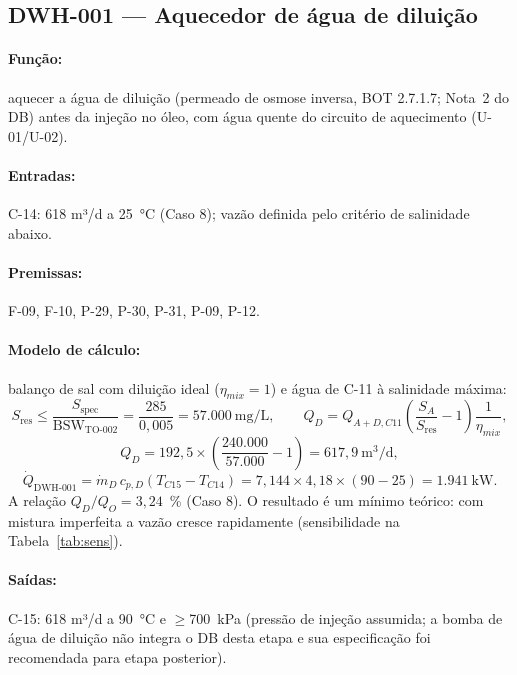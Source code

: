 \documentclass[11pt,a4paper]{article}
\numberwithin{equation}{section}
\numberwithin{table}{section}
\numberwithin{figure}{section}
\begin{document}
\subsection{DWH-001 --- Aquecedor de água de diluição}
\paragraph{Função:} aquecer a água de diluição (permeado de osmose inversa, BOT 2.7.1.7; Nota~2 do DB) antes da injeção no óleo, com água quente do circuito de aquecimento (U-01/U-02).
\paragraph{Entradas:} C-14: 618 m³/d a 25~\si{\celsius} (Caso 8); vazão definida pelo critério de salinidade abaixo.
\paragraph{Premissas:} F-09, F-10, P-29, P-30, P-31, P-09, P-12.
\paragraph{Modelo de cálculo:} balanço de sal com diluição ideal ($\eta_{mix}=1$) e água de C-11 à salinidade máxima:
\begin{equation}\label{eq:dil}
S_{\mathrm{res}}\le\frac{S_{\mathrm{spec}}}{\mathrm{BSW}_{\mbox{TO-002}}}=\frac{285}{0{,}005}=57.000\ \mathrm{mg/L},\qquad Q_{D}=Q_{A+D,C11}\left(\frac{S_A}{S_{\mathrm{res}}}-1\right)\frac{1}{\eta_{mix}},
\end{equation}
\begin{equation}
Q_D=192{,}5\times\left(\frac{240.000}{57.000}-1\right)=617{,}9\ \mathrm{m^3/d},
\end{equation}
\begin{equation}
\dot Q_{\mbox{DWH-001}}=\dot m_D\,c_{p,D}(T_{C15}-T_{C14})=7{,}144\times4{,}18\times(90-25)=1.941\ \mathrm{kW}.
\end{equation}
A relação $Q_D/Q_O=3{,}24$~\% (Caso 8). O resultado é um mínimo teórico: com mistura imperfeita a vazão cresce rapidamente (sensibilidade na Tabela~\ref{tab:sens}).

\paragraph{Saídas:} C-15: 618 m³/d a 90~\si{\celsius} e $\ge$700~\si{\kilo\pascal} (pressão de injeção assumida; a bomba de água de diluição não integra o DB desta etapa e sua especificação foi recomendada para etapa posterior).
\end{document}
